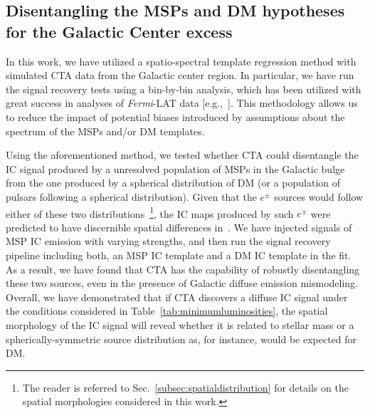 \documentclass[doublespace,nopageskip]{VTthesis} %
\begin{document}
\subsection{Disentangling the MSPs and DM hypotheses for the Galactic Center excess}
\label{subsec:disentanglingMSPsfromDM}

In this work, we have utilized a spatio-spectral template regression method with simulated CTA data from the Galactic center region. In particular, we have run the signal recovery tests using a bin-by-bin analysis, which has been utilized with great success in analyses of \textit{Fermi}-LAT data [e.g.,~\citep{Ackermann:2015zua,TheFermi-LAT:2017vmf}]. This methodology allows us to reduce the impact of potential biases introduced by assumptions about the spectrum of the MSPs and/or DM templates.
 

Using the aforementioned method, we tested whether CTA could disentangle the IC signal produced by a unresolved population of MSPs in the Galactic bulge from the one produced by a spherical distribution of DM (or a population of pulsars following a spherical distribution). Given that the $e^\pm$ sources would follow either of these two distributions~\footnote{The reader is referred to Sec.~\ref{subsec:spatialdistribution} for details on the spatial morphologies considered in this work.}, the IC maps produced by such $e^\pm$ were predicted to have discernible spatial differences in~\cite{Song:2019nrx}. We have injected signals of MSP IC emission with varying strengths, and then run the signal recovery pipeline including both, an MSP IC template and a DM IC template in the fit. As a result, we have found that CTA has the capability of robustly disentangling these two sources, even in the presence of Galactic diffuse emission mismodeling. Overall, we have demonstrated that if CTA discovers a diffuse IC signal under the conditions considered in Table~\ref{tab:minimumluminosities}, the spatial morphology of the IC signal will reveal whether it is related to stellar mass or a spherically-symmetric source distribution as, for instance, would be expected for DM.
\end{document}
